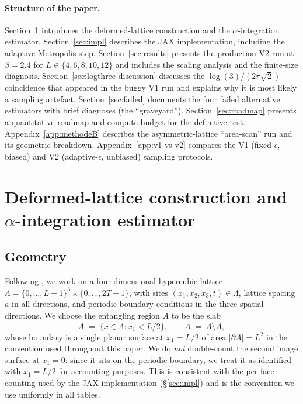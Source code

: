 \documentclass[11pt,a4paper]{article}
\theoremstyle{definition}
\newcommand{\bA}{\overline{A}}
\newcommand{\Lat}{\Lambda}
\begin{document}
\paragraph{Structure of the paper.} Section~\ref{sec:method}
introduces the deformed-lattice construction and the
$\alpha$-integration estimator. Section~\ref{sec:impl} describes the
JAX implementation, including the adaptive Metropolis step.
Section~\ref{sec:results} presents the production V2 run at
$\beta = 2.4$ for $L \in \{4,6,8,10,12\}$ and includes the
scaling analysis and the finite-size diagnosis.
Section~\ref{sec:logthree-discussion} discusses the
$\log(3)/(2\pi\sqrt 2)$ coincidence that appeared in the buggy V1
run and explains why it is most likely a sampling artefact.
Section~\ref{sec:failed} documents the four failed alternative
estimators with brief diagnoses (the ``graveyard'').
Section~\ref{sec:roadmap} presents a quantitative roadmap and
compute budget for the definitive test.
Appendix~\ref{app:methodeB} describes the asymmetric-lattice
``area-scan'' run and its geometric breakdown.
Appendix~\ref{app:v1-vs-v2} compares the V1 (fixed-$\epsilon$,
biased) and V2 (adaptive-$\epsilon$, unbiased) sampling protocols.

\section{Deformed-lattice construction and \texorpdfstring{$\alpha$}{alpha}-integration estimator}
\label{sec:method}

\subsection{Geometry}
\label{sec:geometry}

Following \cite{BP2008b,Rabenstein2019}, we work on a four-dimensional
hypercubic lattice $\Lat = \{0,\dots,L-1\}^{3}\times\{0,\dots,2T-1\}$,
with sites $(x_1,x_2,x_3,t) \in \Lat$, lattice spacing $a$ in all
directions, and periodic boundary conditions in the three spatial
directions. We choose the entangling region $A$ to be the slab
\begin{equation}
   A \;=\; \{x \in \Lat : x_1 < L/2\},
   \qquad
   \bA \;=\; \Lat \setminus A,
   \label{eq:Adef}
\end{equation}
whose boundary is a single planar surface at $x_1 = L/2$ of area
$|\partial A| = L^{2}$ in the convention used throughout this paper.
We do \emph{not} double-count the second image surface at $x_1 = 0$:
since it sits on the periodic boundary, we treat it as identified
with $x_1 = L/2$ for accounting purposes. This is consistent with
the per-face counting used by the JAX implementation
(\S\ref{sec:impl}) and is the convention we use uniformly in all
tables.
\end{document}
